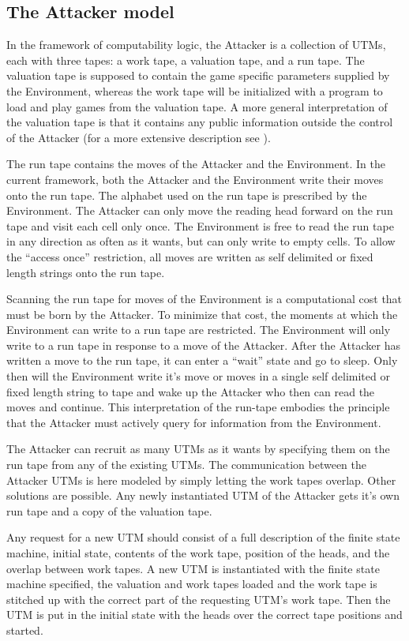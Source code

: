 \documentclass{article}
\begin{document}
\subsection{The Attacker model}

In the framework of computability logic, the Attacker is a collection of UTMs,
each with three tapes: a work tape, a
valuation tape, and a run tape. The
valuation tape is supposed to contain the game specific parameters supplied by
the Environment, whereas the work tape will be initialized with a program to
load and play games from the valuation tape. A more general interpretation of
the valuation tape is that it contains any public information outside the
control of the Attacker (for a more extensive description see \cite{Son0911-5262}).

The run tape contains the moves of the Attacker and the Environment. In the
current framework, both the Attacker and the Environment write their moves onto
the run tape. The alphabet used on the run tape is prescribed by
the Environment.
The Attacker can only move the reading head forward on the run tape and visit each
cell only once. The Environment is
free to read the run tape in any direction as often as it wants, but can only write to empty
cells. To allow the ``access once'' restriction, all moves are written as self delimited
or fixed length strings onto the run tape.

Scanning the run tape for moves of the Environment is a computational
cost that must be born by the Attacker. To minimize that cost, the moments
at which the Environment can write to a run tape are restricted.
The Environment will only write to a
run tape in response to a move of the Attacker. After the Attacker has written a
move to the run tape, it can enter a ``wait'' state and go to sleep.
Only then will the Environment write it's move or moves in a single self 
delimited or fixed length string to tape and wake up the Attacker who then 
can read the moves  and continue.
This interpretation of the
run-tape embodies the principle that the Attacker must actively query for
information from the Environment.

The Attacker can recruit as many UTMs as it wants by specifying
them on the run tape from any of the existing UTMs. The communication between
the Attacker UTMs is here
modeled by simply letting the work tapes overlap. Other solutions are possible.
Any newly instantiated UTM of the Attacker gets it's own run tape and a copy of
the valuation tape. 

Any request for a new UTM should consist of a full
description of the finite state machine, initial state, contents of the work
tape, position of the heads, and the overlap between  work tapes.
A new UTM is instantiated with the finite state machine
specified, the valuation and work tapes loaded and the work tape is stitched up
with the correct part of the requesting UTM's work tape. Then the UTM is put in
the initial state with the heads over the correct tape positions and started.
\end{document}
